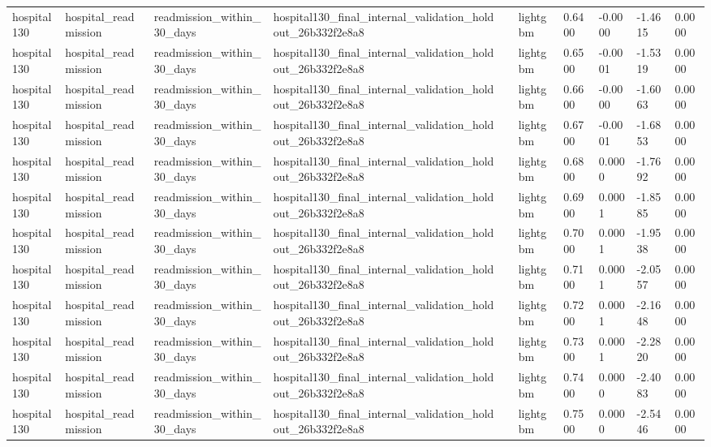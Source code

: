 \begin{tabular}{llllllllll}
hospital130 & hospital\_readmission & readmission\_within\_30\_days & hospital130\_final\_internal\_validation\_holdout\_26b332f2e8a8 &  & lightgbm & 0.6400 & -0.0000 & -1.4615 & 0.0000 \\
hospital130 & hospital\_readmission & readmission\_within\_30\_days & hospital130\_final\_internal\_validation\_holdout\_26b332f2e8a8 &  & lightgbm & 0.6500 & -0.0001 & -1.5319 & 0.0000 \\
hospital130 & hospital\_readmission & readmission\_within\_30\_days & hospital130\_final\_internal\_validation\_holdout\_26b332f2e8a8 &  & lightgbm & 0.6600 & -0.0000 & -1.6063 & 0.0000 \\
hospital130 & hospital\_readmission & readmission\_within\_30\_days & hospital130\_final\_internal\_validation\_holdout\_26b332f2e8a8 &  & lightgbm & 0.6700 & -0.0001 & -1.6853 & 0.0000 \\
hospital130 & hospital\_readmission & readmission\_within\_30\_days & hospital130\_final\_internal\_validation\_holdout\_26b332f2e8a8 &  & lightgbm & 0.6800 & 0.0000 & -1.7692 & 0.0000 \\
hospital130 & hospital\_readmission & readmission\_within\_30\_days & hospital130\_final\_internal\_validation\_holdout\_26b332f2e8a8 &  & lightgbm & 0.6900 & 0.0001 & -1.8585 & 0.0000 \\
hospital130 & hospital\_readmission & readmission\_within\_30\_days & hospital130\_final\_internal\_validation\_holdout\_26b332f2e8a8 &  & lightgbm & 0.7000 & 0.0001 & -1.9538 & 0.0000 \\
hospital130 & hospital\_readmission & readmission\_within\_30\_days & hospital130\_final\_internal\_validation\_holdout\_26b332f2e8a8 &  & lightgbm & 0.7100 & 0.0001 & -2.0557 & 0.0000 \\
hospital130 & hospital\_readmission & readmission\_within\_30\_days & hospital130\_final\_internal\_validation\_holdout\_26b332f2e8a8 &  & lightgbm & 0.7200 & 0.0001 & -2.1648 & 0.0000 \\
hospital130 & hospital\_readmission & readmission\_within\_30\_days & hospital130\_final\_internal\_validation\_holdout\_26b332f2e8a8 &  & lightgbm & 0.7300 & 0.0001 & -2.2820 & 0.0000 \\
hospital130 & hospital\_readmission & readmission\_within\_30\_days & hospital130\_final\_internal\_validation\_holdout\_26b332f2e8a8 &  & lightgbm & 0.7400 & 0.0000 & -2.4083 & 0.0000 \\
hospital130 & hospital\_readmission & readmission\_within\_30\_days & hospital130\_final\_internal\_validation\_holdout\_26b332f2e8a8 &  & lightgbm & 0.7500 & 0.0000 & -2.5446 & 0.0000 \\

\end{tabular}

